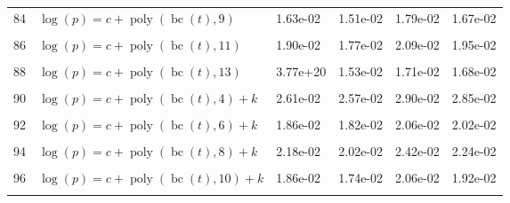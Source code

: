 \documentclass[12pt,a4paper]{article}
\DeclareMathOperator{\bc}{bc}
\DeclareMathOperator{\poly}{poly}
\begin{document}
\begin{longtable}[t]{ll>{\raggedleft\arraybackslash}p{2cm}>{\raggedleft\arraybackslash}p{2cm}>{\raggedleft\arraybackslash}p{2cm}>{\raggedleft\arraybackslash}p{2cm}}
84 & $\log(p) = c + \poly\left( \bc(t), 9 \right)$ & 1.63e-02 & 1.51e-02 & 1.79e-02 & 1.67e-02\\
\cellcolor{gray!6}{85} & \cellcolor{gray!6}{$\log(p) = c + \poly\left( \bc(t), 10 \right)$} & \cellcolor{gray!6}{1.66e-02} & \cellcolor{gray!6}{1.52e-02} & \cellcolor{gray!6}{1.83e-02} & \cellcolor{gray!6}{1.67e-02}\\
86 & $\log(p) = c + \poly\left( \bc(t), 11 \right)$ & 1.90e-02 & 1.77e-02 & 2.09e-02 & 1.95e-02\\
\cellcolor{gray!6}{87} & \cellcolor{gray!6}{$\log(p) = c + \poly\left( \bc(t), 12 \right)$} & \cellcolor{gray!6}{3.56e+15} & \cellcolor{gray!6}{1.72e-02} & \cellcolor{gray!6}{5.59e+01} & \cellcolor{gray!6}{1.90e-02}\\
88 & $\log(p) = c + \poly\left( \bc(t), 13 \right)$ & 3.77e+20 & 1.53e-02 & 1.71e-02 & 1.68e-02\\
\cellcolor{gray!6}{89} & \cellcolor{gray!6}{$\log(p) = c + \poly\left( \bc(t), 3 \right) + k$} & \cellcolor{gray!6}{2.64e-02} & \cellcolor{gray!6}{2.01e-02} & \cellcolor{gray!6}{2.93e-02} & \cellcolor{gray!6}{2.22e-02}\\
90 & $\log(p) = c + \poly\left( \bc(t), 4 \right) + k$ & 2.61e-02 & 2.57e-02 & 2.90e-02 & 2.85e-02\\
\cellcolor{gray!6}{91} & \cellcolor{gray!6}{$\log(p) = c + \poly\left( \bc(t), 5 \right) + k$} & \cellcolor{gray!6}{2.06e-02} & \cellcolor{gray!6}{1.81e-02} & \cellcolor{gray!6}{2.28e-02} & \cellcolor{gray!6}{2.00e-02}\\
92 & $\log(p) = c + \poly\left( \bc(t), 6 \right) + k$ & 1.86e-02 & 1.82e-02 & 2.06e-02 & 2.02e-02\\
\cellcolor{gray!6}{93} & \cellcolor{gray!6}{$\log(p) = c + \poly\left( \bc(t), 7 \right) + k$} & \cellcolor{gray!6}{1.44e+00} & \cellcolor{gray!6}{2.37e-02} & \cellcolor{gray!6}{1.61e+00} & \cellcolor{gray!6}{2.63e-02}\\
94 & $\log(p) = c + \poly\left( \bc(t), 8 \right) + k$ & 2.18e-02 & 2.02e-02 & 2.42e-02 & 2.24e-02\\
\cellcolor{gray!6}{95} & \cellcolor{gray!6}{$\log(p) = c + \poly\left( \bc(t), 9 \right) + k$} & \cellcolor{gray!6}{1.83e-02} & \cellcolor{gray!6}{1.73e-02} & \cellcolor{gray!6}{2.03e-02} & \cellcolor{gray!6}{1.92e-02}\\
96 & $\log(p) = c + \poly\left( \bc(t), 10 \right) + k$ & 1.86e-02 & 1.74e-02 & 2.06e-02 & 1.92e-02\\
\cellcolor{gray!6}{97} & \cellcolor{gray!6}{$\log(p) = c + \poly\left( \bc(t), 11 \right) + k$} & \cellcolor{gray!6}{2.08e-02} & \cellcolor{gray!6}{1.96e-02} & \cellcolor{gray!6}{2.30e-02} & \cellcolor{gray!6}{2.17e-02}\\

\end{longtable}
\end{document}
